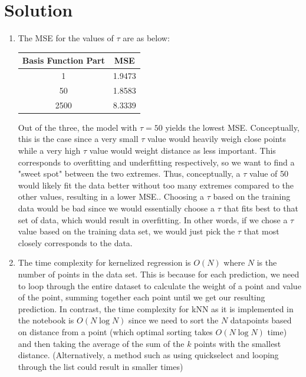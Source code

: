 \documentclass[submit]{../harvardml}
\newenvironment{solution}
  {\color{blue}\section*{Solution}}
{}
\begin{document}
\begin{solution}
\begin{enumerate}
\begin{enumerate}
            \item The MSE for the values of $\tau$ are as below:

            \begin{table}[h]
                \centering
                {\color{blue}
                \begin{tabular}{|c|c|}
                    \hline
                    \textbf{Basis Function Part} & \textbf{MSE} \\
                    \hline
                    1 & 1.9473 \\
                    50 & 1.8583 \\
                    2500 & 8.3339 \\
                    \hline
                \end{tabular}}
                \label{tab:mse_values}
            \end{table}

            Out of the three, the model with $\tau = 50$ yields the lowest MSE. Conceptually, this is the case since a very small $\tau$ value would heavily weigh close points while a very high $\tau$ value would weight distance as less important. This corresponds to overfitting and underfitting respectively, so we want to find a "sweet spot" between the two extremes. Thus, conceptually, a $\tau$ value of 50 would likely fit the data better without too many extremes compared to the other values, resulting in a lower MSE.. Choosing a $\tau$ based on the training data would be bad since we would essentially choose a $\tau$ that fits best to that set of data, which would result in overfitting. In other words, if we chose a $\tau$ value based on the training data set, we would just pick the $\tau$ that most closely corresponds to the data.

            \item The time complexity for kernelized regression is $O(N)$ where $N$ is the number of points in the data set. This is because for each prediction, we need to loop through the entire dataset to calculate the weight of a point and value of the point, summing together each point until we get our resulting prediction. In contrast, the time complexity for kNN as it is implemented in the notebook is $O(N\log N)$ since we need to sort the $N$ datapoints based on distance from a point (which optimal sorting takes $O(N\log N)$ time) and then taking the average of the sum of the $k$ points with the smallest distance. (Alternatively, a method such as using quickselect and looping through the list could result in smaller times) \\


\end{enumerate}
\end{enumerate}
\end{solution}
\end{document}
